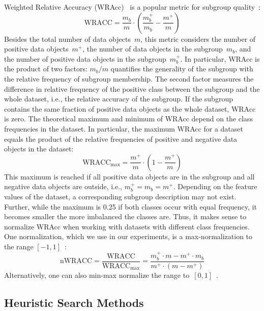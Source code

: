 \documentclass{article}
\theoremstyle{definition}
\begin{document}
Weighted Relative Accuracy (WRAcc)~\cite{lavravc1999rule} is a popular metric for subgroup quality~\cite{meeng2021real}:
%
\begin{equation}
	\text{WRACC} = \frac{m_b}{m} \cdot \left( \frac{m_b^+}{m_b} - \frac{m^+}{m} \right)
	\label{eq:csd:wracc}
\end{equation}
%
Besides the total number of data objects~$m$, this metric considers the number of positive data objects~$m^+$, the number of data objects in the subgroup~$m_b$, and the number of positive data objects in the subgroup~$m_b^+$.
In particular, WRAcc is the product of two factors:
$m_b / m$ quantifies the generality of the subgroup with the relative frequency of subgroup membership.
The second factor measures the difference in relative frequency of the positive class between the subgroup and the whole dataset, i.e., the relative accuracy of the subgroup.
If the subgroup contains the same fraction of positive data objects as the whole dataset, WRAcc is zero.
The theoretical maximum and minimum of WRAcc depend on the class frequencies in the dataset.
In particular, the maximum WRAcc for a dataset equals the product of the relative frequencies of positive and negative data objects in the dataset:
%
\begin{equation}
	\text{WRACC}_{\text{max}} = \frac{m^+}{m} \cdot \left( 1 - \frac{m^+}{m} \right)
	\label{eq:csd:wracc-max}
\end{equation}
%
This maximum is reached if all positive data objects are in the subgroup and all negative data objects are outside, i.e., $m_b^+ = m_b = m^+$.
Depending on the feature values of the dataset, a corresponding subgroup description may not exist.
Further, while the maximum is 0.25 if both classes occur with equal frequency, it becomes smaller the more imbalanced the classes are.
Thus, it makes sense to normalize WRAcc when working with datasets with different class frequencies.
One normalization, which we use in our experiments, is a max-normalization to the range $[-1, 1]$~\cite{mathonat2021anytime}:
%
\begin{equation}
	\text{nWRACC} = \frac{\text{WRACC}}{\text{WRACC}_{\text{max}}} = \frac{m_b^+ \cdot m - m^+ \cdot m_b}{m^+ \cdot (m - m^+)}
	\label{eq:csd:wracc-normalized}
\end{equation}
%
Alternatively, one can also min-max normalize the range to~$[0, 1]$~\cite{carmona2018unifying, ventura2018subgroup}.

\subsection{Heuristic Search Methods}
\label{sec:csd:fundamentals:heuristics}
\end{document}
